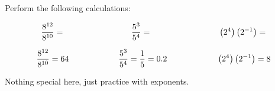

Perform the following calculations:

$${8^{12} \over 8^{10}} = \hbox{\hskip 80pt} {5^{3} \over 5^{4}} = \hbox{\hskip 80pt} \left( 2^4 \right) \left( 2^{-1} \right) = $$







$${8^{12} \over 8^{10}} = 64 \hbox{\hskip 60pt} {5^{3} \over 5^{4}} = {1 \over 5} = 0.2 \hbox{\hskip 60pt} \left( 2^4 \right) \left( 2^{-1} \right) = 8$$







Nothing special here, just practice with exponents.




